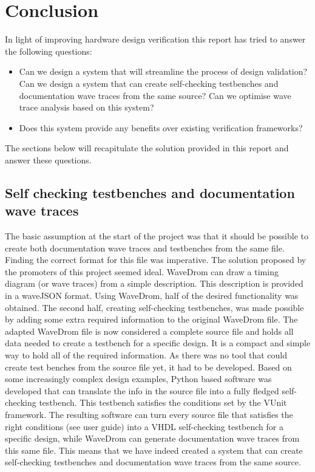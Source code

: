 
\chapter{Conclusion}
In light of improving hardware design verification this report has tried to answer the following questions:
\begin{itemize}
	\item Can we design a system that will streamline the process of design validation?
	\subitem Can we design a system that can create self-checking testbenches and \subsubitem documentation wave traces from the same source?
	\subitem Can we optimise wave trace analysis based on this system?
	\item Does this system provide any benefits over existing verification frameworks?	
\end{itemize}
The sections below will recapitulate the solution provided in this report and answer these questions.
\section{Self checking testbenches and documentation wave traces}
The basic assumption at the start of the project was that it should be possible to create both documentation wave traces and testbenches from the same file. Finding the correct format for this file was imperative. The solution proposed by the promoters of this project seemed ideal. WaveDrom can draw a timing diagram (or wave traces) from a simple description. This description is provided in a waveJSON format. Using WaveDrom, half of the desired functionality was obtained. The second half, creating self-checking testbenches, was made possible by adding some extra required information to the original WaveDrom file. The adapted WaveDrom file is now considered a complete source file and holds all data needed to create a testbench for a specific design. It is a compact and simple way to hold all of the required information.
\npar
As there was no tool that could create test benches from the source file yet, it had to be developed. Based on some increasingly complex design examples, Python based software was developed that can translate the info in the source file into a fully fledged self-checking testbench. This testbench satisfies the conditions set by the VUnit framework.
\npar
The resulting software can turn every source file that satisfies the right conditions (see user guide) into a VHDL self-checking testbench for a specific design, while WaveDrom can generate documentation wave traces from this same file. This means that we have indeed created a system that can create self-checking testbenches and documentation wave traces from the same source.

